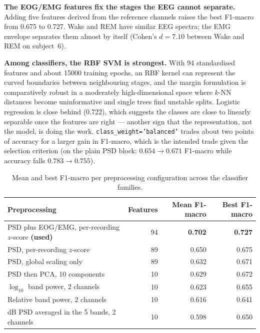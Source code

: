 \documentclass[11pt,a4paper]{article}
\newcommand{\num}[1]{#1}
\begin{document}
\textbf{The EOG/EMG features fix the stages the EEG cannot separate.} Adding five features
derived from the reference channels raises the best F1-macro from \num{0.675} to \num{0.727}.
Wake and REM have similar EEG spectra; the EMG envelope separates them almost by itself
(Cohen's $d = 7.10$ between Wake and REM on subject~6).

\textbf{Among classifiers, the RBF SVM is strongest.} With \num{94} standardised features and
about \num{15000} training epochs, an RBF kernel can represent the curved boundaries between
neighbouring stages, and the margin formulation is comparatively robust in a moderately
high-dimensional space where $k$-NN distances become uninformative and single trees find
unstable splits. Logistic regression is close behind (\num{0.722}), which suggests the classes
are close to linearly separable once the features are right --- another sign that the
representation, not the model, is doing the work. \texttt{class\_weight='balanced'} trades
about two points of accuracy for a larger gain in F1-macro, which is the intended trade given
the selection criterion (on the plain PSD block: $0.654 \rightarrow 0.671$ F1-macro while
accuracy falls $0.783 \rightarrow 0.755$).

\begin{table}[htbp]
\centering\small
\caption{Mean and best F1-macro per preprocessing configuration across the classifier families.}
\label{tab:p2prep}
\begin{tabular}{lrrr}
\toprule
Preprocessing & Features & Mean F1-macro & Best F1-macro \\
\midrule
PSD plus EOG/EMG, per-recording $z$-score \textbf{(used)} & 94 & \textbf{0.702} & \textbf{0.727} \\
PSD, per-recording $z$-score                             & 89 & 0.650 & 0.675 \\
PSD, global scaling only                                 & 89 & 0.632 & 0.671 \\
PSD then PCA, 10 components                              & 10 & 0.629 & 0.672 \\
$\log_{10}$ band power, 2 channels                       & 10 & 0.623 & 0.655 \\
Relative band power, 2 channels                          & 10 & 0.616 & 0.641 \\
dB PSD averaged in the 5 bands, 2 channels               & 10 & 0.598 & 0.650 \\
\bottomrule
\end{tabular}
\end{table}
\end{document}
